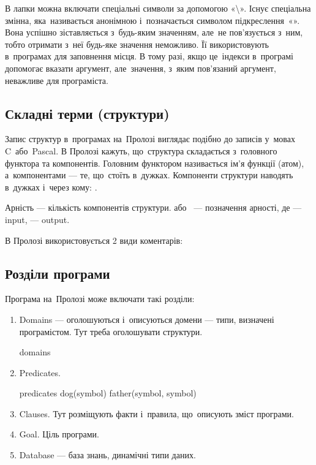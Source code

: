 \documentclass[
	a4paper,
	oneside,
	BCOR = 10mm,
	DIV = 12,
	12pt,
	headings = normal,
]{scrartcl}
\begin{document}
			В лапки можна включати спеціальні символи за допомогою «\textbackslash». Існує спеціальна змінна, яка~називається анонімною і~позначається символом підкреслення~«\proinline{_}». Вона успішно зіставляється з~будь-яким значенням, але~не пов'язується з~ним, тобто отримати з~неї будь-яке значення неможливо. Її використовують в~програмах для заповнення місця. В тому разі, якщо це~індекси в~програмі допомогає вказати аргумент, але~значення, з~яким пов'язаний аргумент, неважливе для програміста. 

		\subsection{Складні терми (структури)}
			Запис структур в~програмах на~Пролозі виглядає подібно до записів у~мовах C~або~Pascal. В Пролозі кажуть, що~структура складається з~головного функтора та компонентів. Головним функтором називається ім'я функції (атом), а~компонентами — те, що~стоїть в~дужках. Компоненти структури наводять в~дужках і~через кому: . 

			Арність — кількість компонентів структури.  або~ — позначення арності, де  — input,  — output. 

			В Пролозі використовується 2 види коментарів:
			\begin{enumerate}
				\item Блочні — .
				\item Строчні — \proinline{%
			\end{enumerate}

		\subsection{Розділи програми} 
			Програма на~Пролозі може включати такі розділи: 
			\begin{enumerate}
				\item Domains — оголошуються і~описуються домени — типи, визначені програмістом. Тут треба оголошувати структури.
					\begin{prologcode}
					domains
					\end{prologcode}
				\item Predicates. 
					\begin{prologcode}
					predicates
						dog(symbol)
						father(symbol, symbol)
					\end{prologcode}
				\item  Clauses. Тут розміщують факти і~правила, що~описують зміст програми. 
				\item  Goal. Ціль програми. 
				\item  Database — база знань, динамічні типи даних. 
			\end{enumerate}
\end{document}
